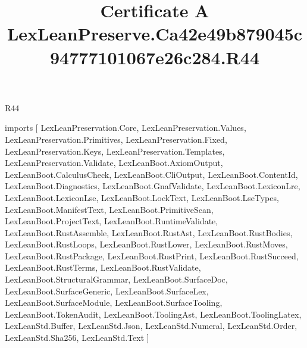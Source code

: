 \begin{lexlean}{R44}
\title{Certificate A LexLeanPreserve.Ca42e49b879045c94777101067e26c284.R44}
\begin{coremodule}
imports [
  LexLeanPreservation.Core,
  LexLeanPreservation.Values,
  LexLeanPreservation.Primitives,
  LexLeanPreservation.Fixed,
  LexLeanPreservation.Keys,
  LexLeanPreservation.Templates,
  LexLeanPreservation.Validate,
  LexLeanBoot.AxiomOutput,
  LexLeanBoot.CalculusCheck,
  LexLeanBoot.CliOutput,
  LexLeanBoot.ContentId,
  LexLeanBoot.Diagnostics,
  LexLeanBoot.GnafValidate,
  LexLeanBoot.LexiconLre,
  LexLeanBoot.LexiconLse,
  LexLeanBoot.LockText,
  LexLeanBoot.LseTypes,
  LexLeanBoot.ManifestText,
  LexLeanBoot.PrimitiveScan,
  LexLeanBoot.ProjectText,
  LexLeanBoot.RuntimeValidate,
  LexLeanBoot.RustAssemble,
  LexLeanBoot.RustAst,
  LexLeanBoot.RustBodies,
  LexLeanBoot.RustLoops,
  LexLeanBoot.RustLower,
  LexLeanBoot.RustMoves,
  LexLeanBoot.RustPackage,
  LexLeanBoot.RustPrint,
  LexLeanBoot.RustSucceed,
  LexLeanBoot.RustTerms,
  LexLeanBoot.RustValidate,
  LexLeanBoot.StructuralGrammar,
  LexLeanBoot.SurfaceDoc,
  LexLeanBoot.SurfaceGeneric,
  LexLeanBoot.SurfaceLex,
  LexLeanBoot.SurfaceModule,
  LexLeanBoot.SurfaceTooling,
  LexLeanBoot.TokenAudit,
  LexLeanBoot.ToolingAst,
  LexLeanBoot.ToolingLatex,
  LexLeanStd.Buffer,
  LexLeanStd.Json,
  LexLeanStd.Numeral,
  LexLeanStd.Order,
  LexLeanStd.Sha256,
  LexLeanStd.Text
]


\end{coremodule}
\end{lexlean}
